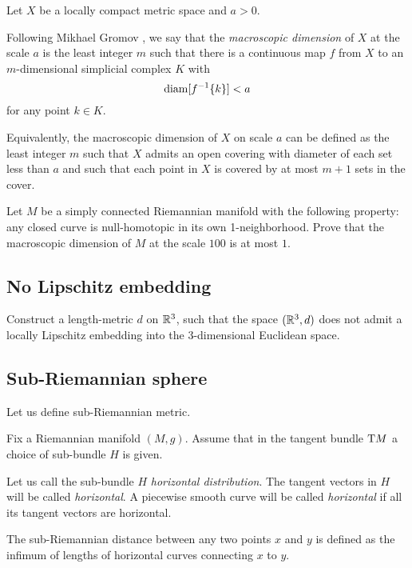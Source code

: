 Let $X$ be a locally compact metric space
and $a>0$.

Following Mikhael Gromov \cite[see][]{gromov:macroscopic-dimension},
we say that the \emph{macroscopic dimension}  of $X$ at the scale $a$ is the least integer $m$ such that there is a continuous map $f$ from $X$ to an $m$-dimensional simplicial complex $K$
with 
\[\operatorname{\rm diam}\nolimits[f^{-1}\{k\}]<a\]
for any point $k\in K$.

Equivalently, the macroscopic dimension of $X$ on scale $a$ can be defined as 
the least integer $m$ such that $X$ admits an open covering with diameter of each set less than $a$ 
and such that each point in $X$ is covered by at most $m+1$ sets in the cover.

\begin{pr}
Let $M$ be a simply connected Riemannian manifold with the following property: 
any closed curve is null-homotopic 
in its own  1-neighborhood. 
Prove that the macroscopic dimension of $M$ at the scale $100$ is at most $1$.
\end{pr}

\subsection*{No Lipschitz embedding\hard}
\label{weird-metric} 

\begin{pr}
Construct a length-metric $d$ on $\mathbb{R}^3$,
such that 
the space $(\mathbb{R}^3,d)$ does not admit a locally Lipschitz embedding into the 3-dimensional Euclidean space.
\end{pr}

\subsection*{Sub-Riemannian sphere\thm}
\label{sub-Riemannian} 

Let us define sub-Riemannian metric.

Fix a Riemannian manifold $(M,g)$.
Assume that in the tangent bundle $\mathrm{T} M$ 
a choice of sub-bundle $H$ is given.

Let us call the sub-bundle $H$  \emph{horizontal distribution}.
The tangent vectors in $H$ will be called {}\emph{horizontal}.
A piecewise smooth curve will be called {}\emph{horizontal}
if all its tangent vectors are horizontal.

The sub-Riemannian distance between any two points $x$ and $y$ is defined as the infimum of lengths of horizontal curves connecting $x$ to $y$.

